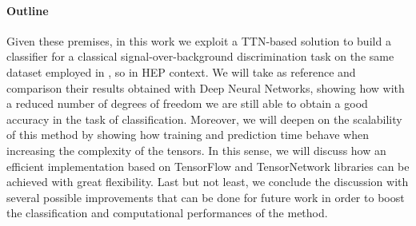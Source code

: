 \documentclass[../main/main.tex]{subfiles}
\begin{document}
\paragraph{Outline}
Given these premises, in this work we exploit a TTN-based solution to build a classifier for a classical signal-over-background discrimination task on the same dataset employed in \cite{baldi}, so in HEP context. We will take as reference and comparison their results obtained with Deep Neural Networks, showing how with a reduced number of degrees of freedom we are still able to obtain a good accuracy in the task of classification. Moreover, we will deepen on the scalability of this method by showing how training and prediction time behave when increasing the complexity of the tensors. In this sense, we will discuss how an efficient implementation based on TensorFlow and TensorNetwork libraries can be achieved with great flexibility. Last but not least, we conclude the discussion with several possible improvements that can be done for future work in order to boost the classification and computational performances of the method.
\end{document}
